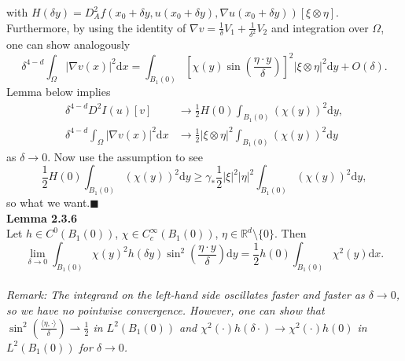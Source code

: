 with $H(\delta y)=D_A^2f(x_0+\delta y,u(x_0+\delta y),\nabla u(x_0+\delta y))[\xi\otimes\eta]$. Furthermore, by using the identity of $\nabla v=\frac{1}{\delta}V_1+\frac{1}{\delta^2}V_2$ and integration over $\Omega$, one can show analogously
\[\delta^{4-d}\int_\Omega{\lvert\nabla v(x)\rvert^2\mathrm{d}x}=\int_{B_1(0)}{\left[\chi(y)\sin\left(\frac{\eta\cdot y}{\delta}\right)\right]^2\lvert\xi\otimes\eta\rvert^2\mathrm{d}y}+O(\delta).\]
Lemma below implies
\begin{align*}
	\delta^{4-d}D^2I(u)[v]&\to\frac{1}{2}H(0)\int_{B_1(0)}{(\chi(y))^2\mathrm{d}y},\\
	\delta^{4-d}\int_\Omega{\lvert\nabla v(x)\rvert^2\mathrm{d}x}&\to\frac{1}{2}\lvert\xi\otimes\eta\rvert^2\int_{B_1(0)}{(\chi(y))^2\mathrm{d}y}
\end{align*}
as $\delta\to0$. Now use the assumption to see
\[\frac{1}{2}H(0)\int_{B_1(0)}{(\chi(y))^2\mathrm{d}y}\geq\gamma_*\frac{1}{2}\lvert\xi\rvert^2\lvert\eta\rvert^2\int_{B_1(0)}{(\chi(y))^2\mathrm{d}y},\]
so what we want.\hfill$\blacksquare$\\[11pt]

\textbf{Lemma 2.3.6}\\
Let $h\in C^0(B_1(0))$, $\chi\in C_c^\infty(B_1(0))$, $\eta\in\mathbb{R}^d\setminus\{0\}$. Then
\[\lim_{\delta\to0}{\int_{B_1(0)}{\chi(y)^2h(\delta y)\sin^2\left(\frac{\eta\cdot y}{\delta}\right)\mathrm{d}y}}=\frac{1}{2}h(0)\int_{B_1(0)}{\chi^2(y)\mathrm{d}x}.\]\\

\textit{Remark: The integrand on the left-hand side oscillates faster and faster as $\delta\to0$, so we have no pointwise convergence. However, one can show that $\sin^2\left(\frac{\langle\eta,\cdot\rangle}{\delta}\right)\rightharpoonup\frac{1}{2}$ in $L^2(B_1(0))$ and $\chi^2(\cdot)h(\delta\cdot)\to\chi^2(\cdot)h(0)$ in $L^2(B_1(0))$ for $\delta\to0$.}\\

